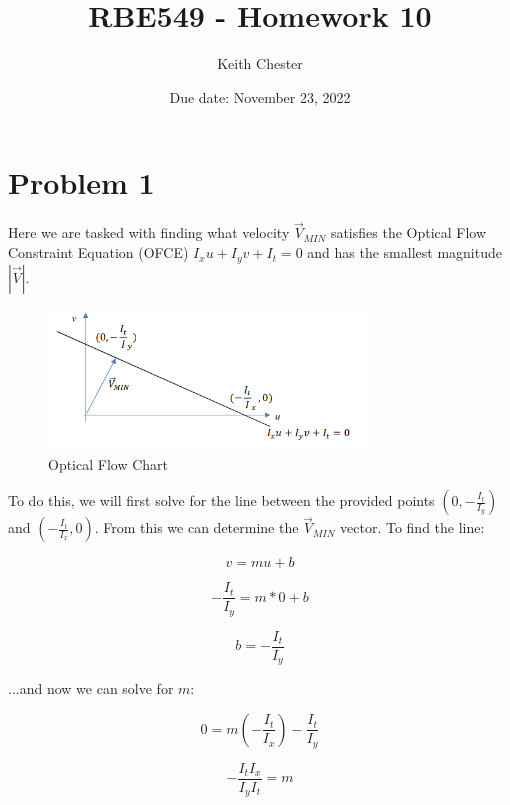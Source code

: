 \documentclass{article}
\title{RBE549 - Homework 10}
\author{Keith Chester}
\date{Due date: November 23, 2022}
\begin{document}
\maketitle

\section*{Problem 1}

Here we are tasked with finding what velocity $\vec{V}_{MIN}$ satisfies the Optical Flow Constraint Equation (OFCE) $I_x u + I_y v + I_t = 0$ and has the smallest magnitude $|\vec{V}|$.

\begin{figure}[H]
    \centering
    \includegraphics[width = 0.75\textwidth]{imgs/1a.png}
    \caption{Optical Flow Chart}
    \label{fig:3a1}
\end{figure}

To do this, we will first solve for the line between the provided points $(0, -\frac{I_t}{I_y})$ and $(-\frac{I_t}{I_x}, 0)$. From this we can determine the $\vec{V}_{MIN}$ vector. To find the line:

\begin{equation}
    v = mu+b
\end{equation}

\begin{equation}
    -\frac{I_t}{I_y} = m*0 + b
\end{equation}

\begin{equation}
    b = -\frac{I_t}{I_y}
\end{equation}

\noindent ...and now we can solve for $m$:

\begin{equation}
    0 = m (-\frac{I_t}{I_x}) - \frac{I_t}{I_y}
\end{equation}

\begin{equation}
    -\frac{I_t I_x}{I_y I_t} = m
\end{equation}
\end{document}
